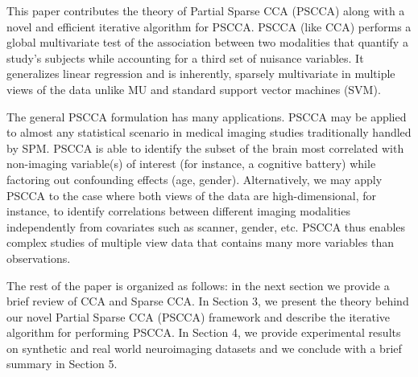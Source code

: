 \documentclass{llncs}
\begin{document}
This paper contributes the theory of Partial Sparse CCA (PSCCA) along
with a novel and efficient iterative algorithm for PSCCA.  PSCCA (like
CCA) performs a global multivariate test of the association between
two modalities that quantify a study's subjects while accounting for a
third set of nuisance variables.  It generalizes linear regression and
is inherently, sparsely multivariate in multiple views of the data
unlike MU and standard support vector machines (SVM).

The general PSCCA formulation has many applications.  PSCCA may be
applied to almost any statistical scenario in medical imaging studies
traditionally handled by SPM.  PSCCA is able to identify the subset of
the brain most correlated with non-imaging variable(s) of interest
(for instance, a cognitive battery) while factoring out confounding
effects (age, gender).  Alternatively, we may apply PSCCA to the case
where both views of the data are high-dimensional, for instance, to
identify correlations between different imaging modalities
independently from covariates such as scanner, gender, etc.  PSCCA
thus enables complex studies of multiple view data that contains many
more variables than observations.

The rest of the paper is organized as follows: in the next section we
provide a brief review of CCA and Sparse CCA. In Section 3, we present
the theory behind our novel Partial Sparse CCA (PSCCA) framework and
describe the iterative algorithm for performing PSCCA. In Section 4,
we provide experimental results on synthetic and real world
neuroimaging datasets and we conclude with a brief summary in Section
5.



\end{document}
